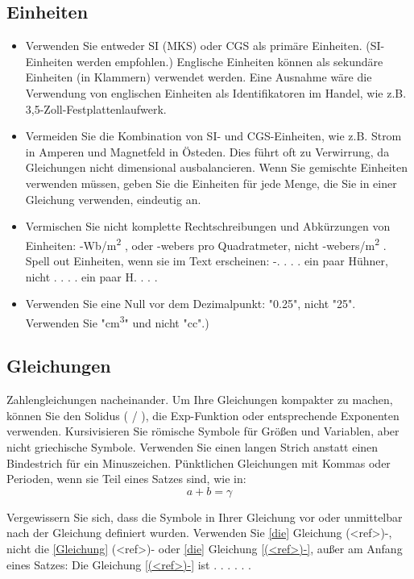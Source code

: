 \documentclass[conference]{IEEEtran}
\begin{document}
\subsection{Einheiten}
\begin{itemize}
\item Verwenden Sie entweder SI (MKS) oder CGS als primäre Einheiten. (SI-Einheiten werden empfohlen.) Englische Einheiten können als sekundäre Einheiten (in Klammern) verwendet werden. Eine Ausnahme wäre die Verwendung von englischen Einheiten als Identifikatoren im Handel, wie z.B. 3,5-Zoll-Festplattenlaufwerk.
\item Vermeiden Sie die Kombination von SI- und CGS-Einheiten, wie z.B. Strom in Amperen und Magnetfeld in Östeden. Dies führt oft zu Verwirrung, da Gleichungen nicht dimensional ausbalancieren. Wenn Sie gemischte Einheiten verwenden müssen, geben Sie die Einheiten für jede Menge, die Sie in einer Gleichung verwenden, eindeutig an.
\item Vermischen Sie nicht komplette Rechtschreibungen und Abkürzungen von Einheiten: -Wb/m\textsuperscript{2} , oder -webers pro Quadratmeter, nicht -webers/m\textsuperscript{2} . Spell out Einheiten, wenn sie im Text erscheinen: -. . . . ein paar Hühner, nicht . . . . ein paar H. . . .
\item Verwenden Sie eine Null vor dem Dezimalpunkt: "0.25", nicht "25". Verwenden Sie "cm\textsuperscript{3}" und nicht "cc".)
\end{itemize}

\subsection{Gleichungen}
Zahlengleichungen nacheinander. Um Ihre Gleichungen kompakter zu machen, können Sie den Solidus ( / ), die Exp-Funktion oder entsprechende Exponenten verwenden. Kursivisieren Sie römische Symbole für Größen und Variablen, aber nicht griechische Symbole. Verwenden Sie einen langen Strich anstatt einen Bindestrich für ein Minuszeichen. Pünktlichen Gleichungen mit Kommas oder Perioden, wenn sie Teil eines Satzes sind, wie in: \begin{equation}
a+b=\gamma\label{eq}
\end{equation}

Vergewissern Sie sich, dass die Symbole in Ihrer Gleichung vor oder unmittelbar nach der Gleichung definiert wurden. Verwenden Sie \eqref{die} Gleichung (<ref>)-, nicht die \eqref{Gleichung} (<ref>)- oder \eqref{die} Gleichung \eqref{(<ref>)-}, außer am Anfang eines Satzes: Die Gleichung \eqref{(<ref>)-} ist . . . . . .
\end{document}
